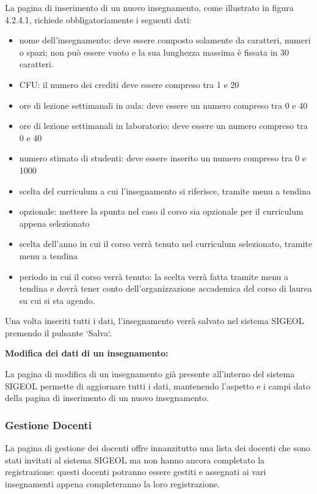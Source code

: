 \documentclass[11pt,a4paper]{article}
\begin{document}
La pagina di inserimento di un nuovo insegnamento, come illustrato in figura 4.2.4.1, richiede obbligatoriamente i seguenti dati:
\begin{itemize}
 \item nome dell'insegnamento: deve essere composto solamente da caratteri, numeri o spazi; non può essere vuoto e la sua lunghezza massima è fissata in 30 caratteri.
 \item CFU: il numero dei crediti deve essere compreso tra 1 e 20
 \item ore di lezione settimanali in aula: deve essere un numero compreso tra 0 e 40
 \item ore di lezione settimanali in laboratorio: deve essere un numero compreso tra 0 e 40
 \item numero stimato di studenti: deve essere inserito un numero compreso tra 0 e 1000
 \item scelta del curriculum a cui l'insegnamento si riferisce, tramite menu a tendina
 \item opzionale: mettere la spunta nel caso il corso sia opzionale per il curriculum appena selezionato
 \item scelta dell'anno in cui il corso verrà tenuto nel curriculum selezionato, tramite menu a tendina
 \item periodo in cui il corso verrà tenuto: la scelta verrà fatta tramite menu a tendina e dovrà tener conto dell'organizzazione accademica del corso di laurea su cui si sta agendo.
\end{itemize}
Una volta inseriti tutti i dati, l'insegnamento verrà salvato nel sistema SIGEOL premendo il pulsante `Salva`.
\newline \newline
\begin{large}\textbf{Modifica dei dati di un insegnamento:}\end{large}
La pagina di modifica di un insegnamento già presente all'interno del sistema SIGEOL permette di aggiornare tutti i dati, mantenendo l'aspetto e i campi dato della pagina di inserimento di un nuovo insegnamento.
\subsubsection{Gestione Docenti}
La pagina di gestione dei docenti offre innanzitutto una lista dei docenti che sono stati invitati al sistema SIGEOL ma non hanno ancora completato la registrazione: questi docenti potranno essere gestiti e assegnati ai vari insegnamenti appena completeranno la loro registrazione.
\end{document}
